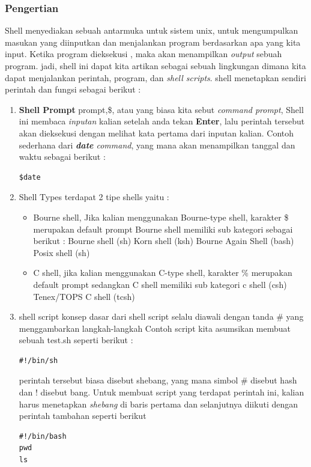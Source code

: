 \subsubsection{Pengertian}
Shell menyediakan sebuah antarmuka untuk sistem unix, untuk mengumpulkan masukan yang diinputkan dan menjalankan program berdasarkan apa yang kita input. Ketika program dieksekusi , maka akan menampilkan \textit{output} sebuah program. 
jadi, shell ini dapat kita artikan sebagai sebuah lingkungan dimana kita dapat menjalankan perintah, program, dan \textit{shell scripts}.
shell menetapkan sendiri perintah dan fungsi sebagai berikut :
\begin{enumerate}
\item \textbf{Shell Prompt}
prompt,\$, atau yang biasa kita sebut \textit{command prompt}, Shell ini membaca \textit{inputan} kalian setelah anda tekan \textbf{Enter}, lalu perintah tersebut akan dieksekusi dengan melihat kata pertama dari inputan kalian.
Contoh sederhana dari \textit{\textbf{date} command}, yang mana akan menampilkan tanggal dan waktu sebagai berikut :
\begin{verbatim}
$date
\end{verbatim}

\item{Shell Types}
terdapat 2 tipe shells yaitu :
\begin{itemize}
\item Bourne shell, Jika kalian menggunakan Bourne-type shell, karakter \$ merupakan default prompt 
Bourne shell memiliki sub kategori sebagai berikut :
\subitem Bourne shell (sh)
\subitem Korn shell (ksh)
\subitem Bourne Again Shell (bash)
\subitem Posix shell (sh)
\item C shell, jika kalian menggunakan C-type shell, karakter \% merupakan default prompt
 sedangkan C shell memiliki sub kategori 
\subitem c shell (csh)
\subitem Tenex/TOPS C shell (tcsh)
\end{itemize}

\item{shell script}
konsep dasar dari shell script selalu diawali dengan tanda \# yang menggambarkan langkah-langkah
Contoh script 
kita asumsikan membuat sebuah test.sh seperti berikut :
\begin{verbatim}
#!/bin/sh
\end{verbatim}
perintah tersebut biasa disebut shebang, yang mana simbol \# disebut hash dan ! disebut bang.
Untuk membuat script yang terdapat perintah ini, kalian harus menetapkan \textit{shebang} di baris pertama dan selanjutnya diikuti dengan perintah tambahan seperti berikut
\begin{verbatim}
#!/bin/bash
pwd
ls
\end{verbatim}
\end{enumerate}

